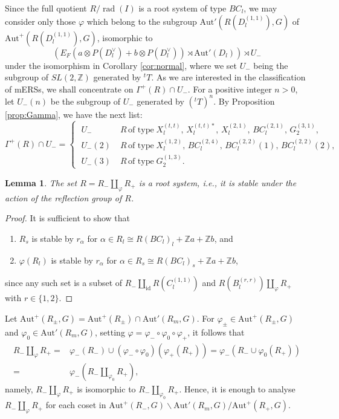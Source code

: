 \documentclass[11pt]{amsart}
\newcommand{\Z}{\mathbb{Z}}
\newcommand{\Aut}{\mathrm{Aut}}
\newcommand{\id}{\mathrm{id}}
\newtheorem{lemma}[thm]{Lemma}%
\newcommand{\rad}{\operatorname{rad}}
\begin{document}
Since the full quotient $R/\rad(I)$ is a root system of type $BC_l$, we may consider only those $\varphi$ which belong to the subgroup $\Aut'(R(D_l^{(1,1)}),G)$ of $\Aut^+(R(D_l^{(1,1)}),G)$,  isomorphic to
\[ \left(E_F(a \otimes P(D_l^\vee) + b \otimes P(D_l^\vee))\rtimes \Aut'(D_l)\right) \rtimes U_-  \]
under the isomorphism in Corollary \ref{cor:normal}, where we set $U_-$ being the subgroup of $SL(2,\Z)$ generated by ${}^tT$. As we are interested in the classification of mERSs, we shall concentrate on $\Gamma^+(R) \cap U_-$.  For a positive integer $n>0$, let $U_-(n)$ be the subgroup of $U_-$ generated by $({}^tT)^n$. 
By Proposition \ref{prop:Gamma}, we have the next list:
\[ \Gamma^+(R) \cap U_-=\begin{cases} \; U_-\; 
                  & R\, \text{of type}\; X_l^{(t,t)}, \, X_l^{(t,t)\ast}, \, X_l^{(2,1)}, \, BC_l^{(2,1)}, \, G_2^{(3,1)}, \\
                                                                \; U_-(2)\; 
                  & R\, \text{of type}\; X_l^{(1,2)}, \, BC_l^{(2,4)}, \, BC_l^{(2,2)}(1), \, BC_l^{(2,2)}(2), \\
                                                               \; U_-(3)\; 
                  & R\, \text{of type}\; G_2^{(1,3)}.
                                          \end{cases}
\]
\begin{lemma}
The set $R=R_- \amalg_\varphi R_+$ is a root system, i.e., it is stable under the action of the reflection group of $R$. 
\end{lemma}
\begin{proof}
It is sufficient to show that 
\begin{enumerate}
\item
$R_s$ is stable by $r_\alpha$ for $\alpha \in R_l\cong R(BC_l)_l+\Z a+\Z b$, and
\item
$\varphi(R_l)$ is stable by $r_\alpha$ for $\alpha \in R_s \cong R(BC_l)_s+\Z a+\Z b$,
\end{enumerate}
since any such set is a subset of $R_- \amalg_{\id} R(C_l^{(1,1)})$ and $R(B_l^{(r,r)}) \amalg_{\varphi} R_+$ with $r \in \{1,2\}$. 
\end{proof}

Let  $\Aut^+(R_\pm,G)= \Aut^+(R_\pm) \cap \Aut'(R_m,G)$. For $\varphi_{\pm} \in \Aut^+(R_\pm,G)$ and $\varphi_0 \in \Aut'(R_m,G)$, setting  $\varphi=\varphi_-\circ \varphi_0 \circ \varphi_+$, it follows that
\begin{align*}
R_- \amalg_{\varphi} R_+=
&\varphi_-(R_-) \cup (\varphi_-\circ \varphi_0)(\varphi_+(R_+)) 
=\varphi_-(R_- \cup \varphi_0(R_+)) \\
=
&\varphi_-(R_- \amalg_{\varphi_0} R_+),
\end{align*}
namely, $R_- \amalg_\varphi R_+$ is isomorphic to $R_- \amalg_{\varphi_0} R_+$. Hence, 
it is enough to analyse $R_- \amalg_\varphi R_+$ for each coset in $\Aut^+(R_-,G) \backslash \Aut'(R_m,G) \slash \Aut^+(R_+,G)$. 
\end{document}
